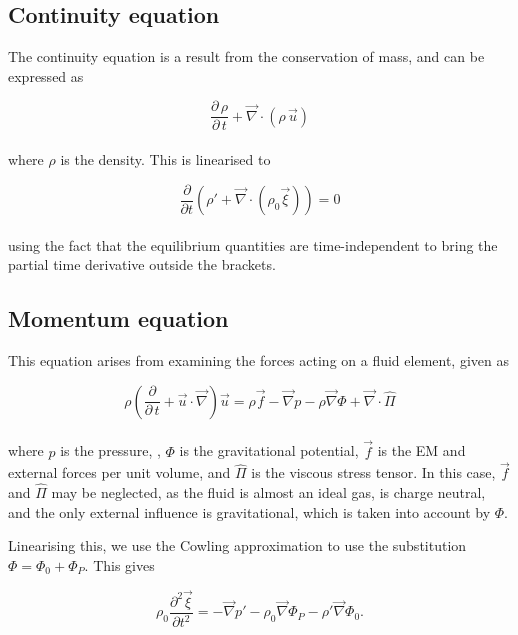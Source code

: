 \documentclass[11pt]{amsart}
\begin{document}
\subsection{Continuity equation}

The continuity equation is a result from the conservation of mass, and can be expressed as

\begin{equation} \frac{\partial \, \rho}{\partial \, t} + \vec{\nabla} \cdot ( \rho \, \vec{u} )
\end{equation}
\\
where $\rho$ is the density.  This is linearised to

\begin{equation}
\frac{\partial}{\partial t} \left( \rho' + \vec{\nabla} \cdot \left( \rho_{0} \vec{\xi} \right) \right) = 0
\end{equation}
\\
using the fact that the equilibrium quantities are time-independent to bring the partial time
derivative outside the brackets.



\subsection{Momentum equation}

This equation arises from examining the forces acting on a fluid element, given as

\begin{equation} \rho \left( \frac{\partial}{\partial \, t} +  \vec{u} \cdot \vec{\nabla} \right)
\vec{u} = \rho \vec{f} - \vec{\nabla} p - \rho \vec{\nabla} \Phi + \vec{\nabla} \cdot \hat{\Pi}
\end{equation}
\\
where $p$ is the pressure, , $\Phi$ is the gravitational potential, $\vec{f}$ is
the EM and external forces per unit volume, and $\hat{\Pi}$ is the viscous stress tensor. In this
case, $\vec{f}$ and $\hat{\Pi}$ may be neglected, as the fluid is almost an ideal gas, is charge
neutral, and the only external influence is gravitational, which is taken into account by $\Phi$.

Linearising this, we use the Cowling approximation to use the substitution $\Phi = \Phi_{0} + \Phi_{P}$.
This gives

\begin{equation}
\rho_{0} \frac{\partial^{2} \vec{\xi}}{\partial t^{2}} = - \vec{\nabla} p' - \rho_{0} \vec{\nabla} \Phi_{P}
- \rho' \vec{\nabla} \Phi_{0}.
\end{equation}
\end{document}
